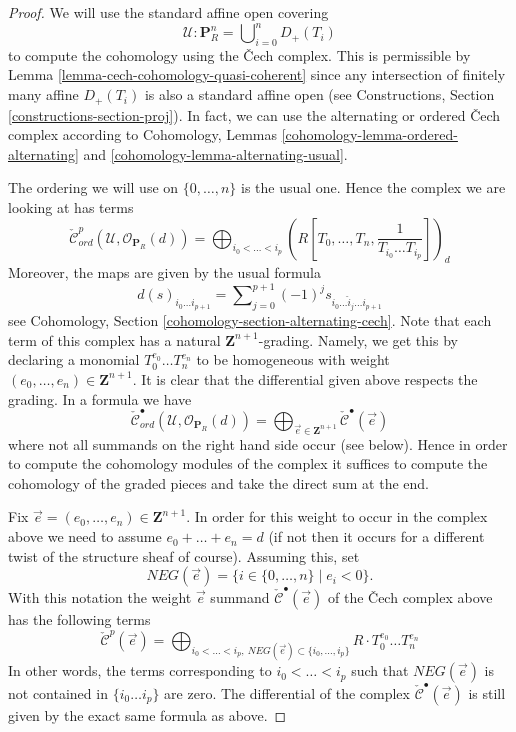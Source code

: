 \documentclass{stacks-project}
\theoremstyle{plain}
\theoremstyle{definition}
\theoremstyle{remark}
\numberwithin{equation}{subsection}
\begin{document}
\begin{proof}
We will use the standard affine open covering
$$
\mathcal{U} : \mathbf{P}^n_R = \bigcup\nolimits_{i = 0}^n D_{+}(T_i)
$$
to compute the cohomology using the {\v C}ech complex.
This is permissible by Lemma \ref{lemma-cech-cohomology-quasi-coherent}
since any intersection of finitely many affine $D_{+}(T_i)$ is also a
standard affine open (see
Constructions, Section \ref{constructions-section-proj}).
In fact, we can use the alternating or ordered {\v C}ech complex according to
Cohomology, Lemmas \ref{cohomology-lemma-ordered-alternating} and
\ref{cohomology-lemma-alternating-usual}.

\medskip\noindent
The ordering we will use on $\{0, \ldots, n\}$ is the usual one.
Hence the complex we are looking at has terms
$$
\check{\mathcal{C}}_{ord}^p(\mathcal{U}, \mathcal{O}_{\mathbf{P}_R}(d))
=
\bigoplus\nolimits_{i_0 < \ldots < i_p}
(R[T_0, \ldots, T_n, \frac{1}{T_{i_0} \ldots T_{i_p}}])_d
$$
Moreover, the maps are given by the usual formula
$$
d(s)_{i_0 \ldots i_{p + 1}} =
\sum\nolimits_{j = 0}^{p + 1} (-1)^j s_{i_0 \ldots \hat i_j \ldots i_{p + 1}}
$$
see Cohomology, Section \ref{cohomology-section-alternating-cech}.
Note that each term of this complex has a natural
$\mathbf{Z}^{n + 1}$-grading. Namely, we get this by declaring a monomial
$T_0^{e_0} \ldots T_n^{e_n}$ to be homogeneous with weight
$(e_0, \ldots, e_n) \in \mathbf{Z}^{n + 1}$. It is clear that the differential
given above respects the grading. In a formula we have
$$
\check{\mathcal{C}}_{ord}^\bullet(\mathcal{U}, \mathcal{O}_{\mathbf{P}_R}(d))
=
\bigoplus\nolimits_{\vec{e} \in \mathbf{Z}^{n + 1}}
\check{\mathcal{C}}^\bullet(\vec{e})
$$
where not all summands on the right hand side occur (see below).
Hence in order to compute the cohomology
modules of the complex it suffices to compute the cohomology of the graded
pieces and take the direct sum at the end.

\medskip\noindent
Fix $\vec{e} = (e_0, \ldots, e_n) \in \mathbf{Z}^{n + 1}$. In order for this
weight to occur in the complex above we need to assume
$e_0 + \ldots + e_n = d$ (if not then it occurs for a different twist of
the structure sheaf of course). Assuming this, set
$$
NEG(\vec{e}) = \{i \in \{0, \ldots, n\} \mid e_i < 0\}.
$$
With this notation the weight $\vec{e}$ summand
$\check{\mathcal{C}}^\bullet(\vec{e})$ of the {\v C}ech complex above has
the following terms
$$
\check{\mathcal{C}}^p(\vec{e})
=
\bigoplus\nolimits_{i_0 < \ldots < i_p,
\ NEG(\vec{e}) \subset \{i_0, \ldots, i_p\}}
R \cdot T_0^{e_0} \ldots T_n^{e_n}
$$
In other words, the terms corresponding to $i_0 < \ldots < i_p$ such
that $NEG(\vec{e})$ is not contained in $\{i_0 \ldots i_p\}$ are zero.
The differential of the complex $\check{\mathcal{C}}^\bullet(\vec{e})$
is still given by the exact same formula as above.


\end{proof}
\end{document}
